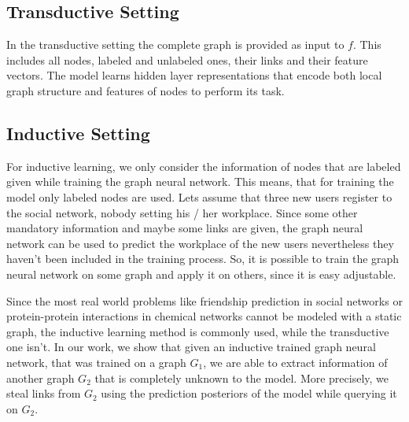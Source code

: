     \subsection*{Transductive Setting}

      In the transductive setting \cite{kipf2017semisupervised} the complete graph is provided as input to $f$.
      This includes all nodes, labeled and unlabeled ones, their links and their feature vectors.
      The model learns hidden layer representations that encode both local graph structure and features of nodes to perform its task.

    \subsection*{Inductive Setting}


      For inductive learning, we only consider the information of nodes that are labeled given while training the graph neural network.
      This means, that for training the model only labeled nodes are used.
      Lets assume that three new users register to the social network, nobody setting his / her workplace.
      Since some other mandatory information and maybe some links are given, the graph neural network can be used to predict the workplace of the new users nevertheless they haven't been included in the training process.
      So, it is possible to train the graph neural network on some graph and apply it on others, since it is easy adjustable.
        
      Since the most real world problems like friendship prediction in social networks or protein-protein interactions in chemical networks cannot be modeled with a static graph, the inductive learning method is commonly used, while the transductive one isn't.
      In our work, we show that given an inductive trained graph neural network, that was trained on a graph $G_1$, we are able to extract information of another graph $G_2$ that is completely unknown to the model.
      More precisely, we steal links from $G_2$ using the prediction posteriors of the model while querying it on $G_2$.


